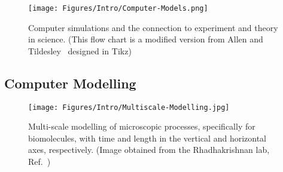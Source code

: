 \begin{figure}[t!]
\centering
\texttt{[image: Figures/Intro/Computer-Models.png]}
\caption{Computer simulations and the connection to experiment and theory in science. 
(This flow chart is a modified version from Allen and Tildesley~\cite{Allen1987} designed 
in Tikz)}
\label{intro:models}
\end{figure}

\pagebreak
\subsection{Computer Modelling}

\vskip 0.5cm

\begin{figure}[b!]
\begin{minipage}{\textwidth}
\centering
\texttt{[image: Figures/Intro/Multiscale-Modelling.jpg]}
\caption{Multi-scale modelling of microscopic processes, specifically for biomolecules, 
with time and length in the vertical and horizontal axes, respectively. (Image obtained 
from the Rhadhakrishnan lab, Ref.~\cite{Radhakrishnan2018})}
\label{intro:mscale}
\end{minipage}
\end{figure}

